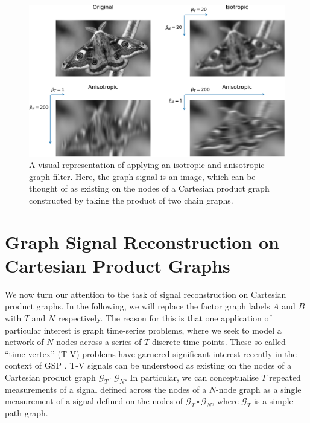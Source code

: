 \begin{figure}[t]
    \includegraphics[width=0.9\linewidth]{Figures/filter_types_butterfly.pdf}
    \caption[A visual representation of applying an isotropic and anisotropic graph filter]{A visual representation of applying an isotropic and anisotropic graph filter. Here, the graph signal is an image, which can be thought of as existing on the nodes of a Cartesian product graph constructed by taking the product of two chain graphs. }
    \label{fig:filters}
\end{figure}



\section{Graph Signal Reconstruction on Cartesian Product Graphs}

\label{sec:gsr_cpg}

We now turn our attention to the task of signal reconstruction on Cartesian product graphs. In the following, we will replace the factor graph labels $A$ and $B$ with $T$ and $N$ respectively. The reason for this is that one application of particular interest is graph time-series problems, where we seek to model a network of $N$ nodes across a series of $T$ discrete time points. These so-called ``time-vertex'' (T-V) problems have garnered significant interest recently in the context of GSP \citep{Grassi2018, Isufi2017, Loukas2016}. T-V signals can be understood as existing on the nodes of a Cartesian product graph $\mathcal{G}_T \, \square \, \mathcal{G}_N$. In particular, we can conceptualise $T$ repeated measurements of a signal defined across the nodes of a $N$-node graph as a single measurement of a signal defined on the nodes of $\mathcal{G}_T \, \square \, \mathcal{G}_N$, where $\mathcal{G}_T$ is a simple path graph.

